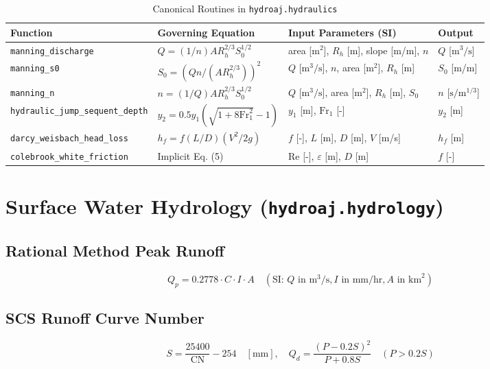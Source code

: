 \documentclass[11pt,a4paper]{article}
\begin{document}
\begin{table}[htbp]
\centering
\caption{Canonical Routines in \texttt{hydroaj.hydraulics}}
\begin{tabular}{@{}llll@{}}
\toprule
\textbf{Function} & \textbf{Governing Equation} & \textbf{Input Parameters (SI)} & \textbf{Output} \\
\midrule
\texttt{manning\_discharge} & $Q = (1/n) A R_h^{2/3} S_0^{1/2}$ & area [$\text{m}^2$], $R_h$ [m], slope [m/m], $n$ & $Q$ [$\text{m}^3/\text{s}$] \\
\texttt{manning\_s0} & $S_0 = (Q n / (A R_h^{2/3}))^2$ & $Q$ [$\text{m}^3/\text{s}$], $n$, area [$\text{m}^2$], $R_h$ [m] & $S_0$ [m/m] \\
\texttt{manning\_n} & $n = (1/Q) A R_h^{2/3} S_0^{1/2}$ & $Q$ [$\text{m}^3/\text{s}$], area [$\text{m}^2$], $R_h$ [m], $S_0$ & $n$ [$\text{s}/\text{m}^{1/3}$] \\
\texttt{hydraulic\_jump\_sequent\_depth} & $y_2 = 0.5 y_1 (\sqrt{1+8\text{Fr}_1^2}-1)$ & $y_1$ [m], $\text{Fr}_1$ [-] & $y_2$ [m] \\
\texttt{darcy\_weisbach\_head\_loss} & $h_f = f (L/D) (V^2/2g)$ & $f$ [-], $L$ [m], $D$ [m], $V$ [m/s] & $h_f$ [m] \\
\texttt{colebrook\_white\_friction} & Implicit Eq. (5) & $\text{Re}$ [-], $\varepsilon$ [m], $D$ [m] & $f$ [-] \\
\bottomrule
\end{tabular}
\end{table}

\section{Surface Water Hydrology (\texttt{hydroaj.hydrology})}

\subsection{Rational Method Peak Runoff}
\begin{equation}
    Q_p = 0.2778 \cdot C \cdot I \cdot A \quad (\text{SI: } Q \text{ in } \text{m}^3/\text{s}, I \text{ in mm/hr}, A \text{ in } \text{km}^2)
\end{equation}

\subsection{SCS Runoff Curve Number}
\begin{equation}
    S = \frac{25400}{\text{CN}} - 254 \quad [\text{mm}], \quad Q_d = \frac{(P - 0.2 S)^2}{P + 0.8 S} \quad (P > 0.2 S)
\end{equation}
\end{document}
